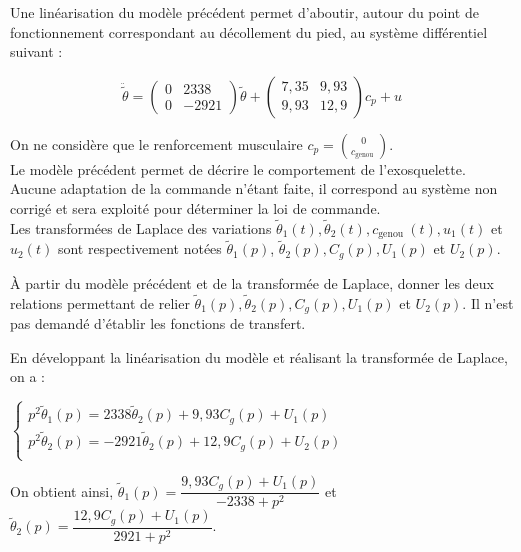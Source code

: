 \ifprof
\else

Une linéarisation du modèle précédent permet d'aboutir, autour du point de fonctionnement correspondant au décollement du pied, au système différentiel suivant :

$$
\ddot{\tilde{\theta}}=\left(\begin{array}{cc}
0 & 2338 \\
0 & -2921
\end{array}\right) \tilde{\theta}+\left(\begin{array}{cc}
7,35 & 9,93 \\
9,93 & 12,9
\end{array}\right) c_{p}+u
$$

On ne considère que le renforcement musculaire $c_{p}=\binom{0}{c_{\text {genou }}}$.\\
Le modèle précédent permet de décrire le comportement de l'exosquelette. Aucune adaptation de la commande n'étant faite, il correspond au système non corrigé et sera exploité pour déterminer la loi de commande.\\
Les transformées de Laplace des variations $\tilde{\theta}_{1}(t), \tilde{\theta}_{2}(t), c_{\text {genou }}(t), u_{1}(t)$ et $u_{2}(t)$ sont respectivement notées $\tilde{\theta}_{1}(p)$, $\tilde{\theta}_{2}(p), C_{g}(p), U_{1}(p)$ et $U_{2}(p)$.\\

\fi

\begin{question}
\label{2023_ccs_psi_q_23} 
À partir du modèle précédent et de la transformée de Laplace, donner les deux relations permettant de relier $\tilde{\theta}_{1}(p), \tilde{\theta}_{2}(p), C_{g}(p), U_{1}(p)$ et $U_{2}(p)$. Il n'est pas demandé d'établir les fonctions de transfert.\\
\end{question}
\ifprof
\begin{corrige}
En développant la linéarisation du modèle et réalisant la transformée de Laplace, on a :

$
\left\{
\begin{array}{l}
p^2 \tilde{\theta}_1(p) = 2338 \tilde{\theta}_2(p) + 9,93 C_g(p) + U_1(p) \\
p^2 \tilde{\theta}_2(p) = -2921 \tilde{\theta}_2(p) + 12,9 C_g(p) + U_2(p) \\
\end{array}
\right.
$

On obtient ainsi,
$\tilde{\theta}_1(p)=\dfrac{ 9,93 C_g(p) + U_1(p)}{-2338+p^2} $
et
$\tilde{\theta}_2(p)=\dfrac{ 12,9 C_g(p) + U_1(p)}{2921+p^2}$.

\end{corrige}
\else
\fi

